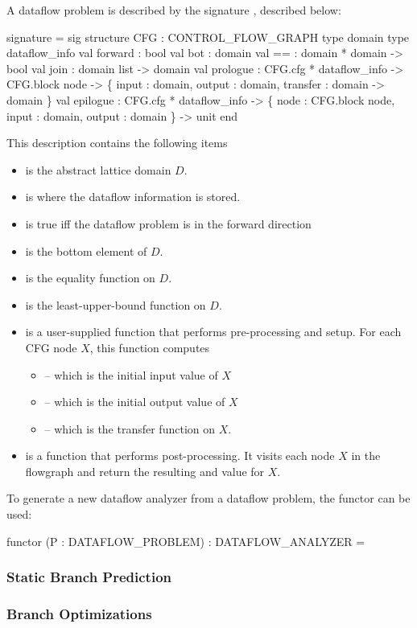 A dataflow problem is described by the signature , 
described below:
\begin{SML}
 signature  = sig
   structure CFG : CONTROL_FLOW_GRAPH
   type domain
   type dataflow_info
   val forward   : bool
   val bot       : domain
   val ==        : domain * domain -> bool
   val join      : domain list -> domain
   val prologue  : CFG.cfg * dataflow_info ->
                       CFG.block node ->
                           \{ input    : domain,
                             output   : domain,
                             transfer : domain -> domain
                           \}
   val epilogue  : CFG.cfg * dataflow_info ->
                       \{ node   : CFG.block node,
                         input  : domain,
                         output : domain
                       \} -> unit
 end
\end{SML}
This description contains the following items
\begin{itemize}
\item {} is the abstract lattice domain $D$.
\item {} is where the dataflow information
is stored.
\item {} is true iff the dataflow problem is in the
forward direction
\item {} is the bottom element of $D$.
\item \sml{==} is the equality function on $D$.
\item {} is the least-upper-bound function on $D$.
\item {} is a user-supplied function that performs
pre-processing and setup.  For each CFG node $X$, this function
computes
\begin{itemize}
 \item  {} -- which is the initial input value of $X$
 \item {} -- which is the initial output value of $X$
 \item {} -- which is the transfer function on $X$.
\end{itemize}
\item {} is a function that performs post-processing.
It visits each node $X$ in the flowgraph and return the resulting
 and  value for $X$. 
\end{itemize}

To generate a new dataflow analyzer from a dataflow problem, 
the functor  can be used:
\begin{SML}
 functor (P : DATAFLOW_PROBLEM) : DATAFLOW_ANALYZER =
\end{SML}

\subsubsection{Static Branch Prediction} 

\subsubsection{Branch Optimizations}
